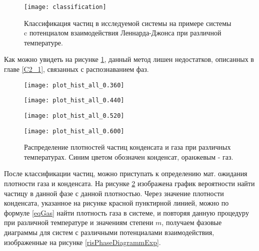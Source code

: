 \begin{figure}[h]
\begin{center}
\texttt{[image: classification]}
\caption{Классификация частиц в исследуемой системы на примере системы c потенциалом взаимодействия Леннарда-Джонса при различной температуре.}
\label{risClassExp}
\end{center}
\end{figure}

Как можно увидеть на рисунке \ref{risClassExp}, данный метод лишен недостатков, описанных в главе \ref{C2_1}, связанных с распознаванием фаз.




\begin{figure}[h]
\begin{center}

\begin{minipage}[h]{0.45\linewidth}
\texttt{[image: plot\_hist\_all\_0.360]}
\end{minipage}
\begin{minipage}[h]{0.45\linewidth}
\texttt{[image: plot\_hist\_all\_0.440]}
\end{minipage}


\begin{minipage}[h]{0.45\linewidth}
\texttt{[image: plot\_hist\_all\_0.520]}
\end{minipage}
\begin{minipage}[h]{0.45\linewidth}
\texttt{[image: plot\_hist\_all\_0.600]}
\end{minipage}
\caption{Распределение плотностей частиц конденсата и газа при различных температурах. Синим цветом обозначен конденсат, оранжевым  - газ.}
\label{risRhoM}
\end{center}
\end{figure}


После классификации частиц, можно приступать к определению мат. ожидания плотности газа и конденсата. На рисунке \ref{risRhoM} изображена график вероятности найти частицу в данной фазе с данной плотностью. Через значение плотности конденсата, указанное на рисунке красной пунктирной линией, можно по формуле \ref{eqGas} найти плотность газа в системе, и повторяя данную процедуру при различной температуре и значениям степени $m$, получаем фазовые диаграммы для систем с различными потенциалами взаимодействия, изображенные на рисунке \ref{risPhaseDiagrammExp}.


